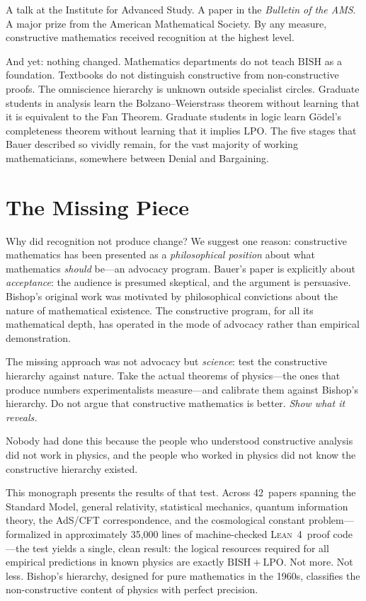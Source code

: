 \documentclass[11pt,a4paper]{report}
\theoremstyle{plain}
\theoremstyle{definition}
\theoremstyle{remark}
\newcommand{\BISH}{\mathrm{BISH}}
\newcommand{\LPO}{\mathrm{LPO}}
\newcommand{\Lean}{\textsc{Lean~4}}
\begin{document}
A talk at the Institute for Advanced Study. A paper in the \emph{Bulletin of the AMS}. A major prize from the American Mathematical Society. By any measure, constructive mathematics received recognition at the highest level.

And yet: nothing changed. Mathematics departments do not teach $\BISH$ as a foundation. Textbooks do not distinguish constructive from non-constructive proofs. The omniscience hierarchy is unknown outside specialist circles. Graduate students in analysis learn the Bolzano--Weierstrass theorem without learning that it is equivalent to the Fan Theorem. Graduate students in logic learn G\"odel's completeness theorem without learning that it implies $\LPO$. The five stages that Bauer described so vividly remain, for the vast majority of working mathematicians, somewhere between Denial and Bargaining.

\section*{The Missing Piece}

Why did recognition not produce change? We suggest one reason: constructive mathematics has been presented as a \emph{philosophical position} about what mathematics \emph{should} be---an advocacy program. Bauer's paper is explicitly about \emph{acceptance}: the audience is presumed skeptical, and the argument is persuasive. Bishop's original work was motivated by philosophical convictions about the nature of mathematical existence. The constructive program, for all its mathematical depth, has operated in the mode of advocacy rather than empirical demonstration.

The missing approach was not advocacy but \emph{science}: test the constructive hierarchy against nature. Take the actual theorems of physics---the ones that produce numbers experimentalists measure---and calibrate them against Bishop's hierarchy. Do not argue that constructive mathematics is better. \emph{Show what it reveals.}

Nobody had done this because the people who understood constructive analysis did not work in physics, and the people who worked in physics did not know the constructive hierarchy existed.

This monograph presents the results of that test. Across 42~papers spanning the Standard Model, general relativity, statistical mechanics, quantum information theory, the AdS/CFT correspondence, and the cosmological constant problem---formalized in approximately 35{,}000 lines of machine-checked \Lean\ proof code---the test yields a single, clean result: the logical resources required for all empirical predictions in known physics are exactly $\BISH+\LPO$. Not more. Not less. Bishop's hierarchy, designed for pure mathematics in the 1960s, classifies the non-constructive content of physics with perfect precision.
\end{document}
